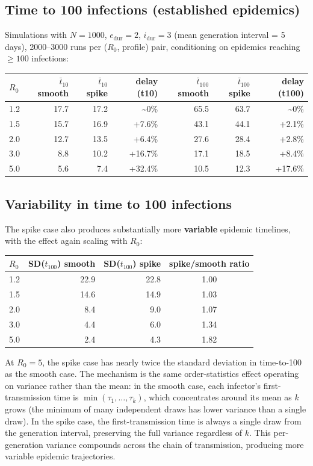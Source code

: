 \documentclass[11pt]{article}
\begin{document}
\subsection{Time to 100 infections (established epidemics)}

Simulations with $N = 1000$, $e_{\text{dur}} = 2$, $i_{\text{dur}} = 3$ (mean generation interval = 5 days), 2000--3000 runs per ($R_0$, profile) pair, conditioning on epidemics reaching $\geq 100$ infections:

\medskip
{\footnotesize
\begin{tabular}{lrrrrrr}
\toprule
$R_0$ & $\bar{t}_{10}$ smooth & $\bar{t}_{10}$ spike & delay (t10) & $\bar{t}_{100}$ smooth & $\bar{t}_{100}$ spike & delay (t100) \\
\midrule
1.2 & 17.7 & 17.2 & \textasciitilde0\% & 65.5 & 63.7 & \textasciitilde0\% \\
1.5 & 15.7 & 16.9 & +7.6\% & 43.1 & 44.1 & +2.1\% \\
2.0 & 12.7 & 13.5 & +6.4\% & 27.6 & 28.4 & +2.8\% \\
3.0 & 8.8  & 10.2 & +16.7\% & 17.1 & 18.5 & +8.4\% \\
5.0 & 5.6  & 7.4  & +32.4\% & 10.5 & 12.3 & +17.6\% \\
\bottomrule
\end{tabular}
}
\medskip

\subsection{Variability in time to 100 infections}

The spike case also produces substantially more \textbf{variable} epidemic timelines, with the effect again scaling with $R_0$:

\medskip
\begin{tabular}{lrrc}
\toprule
$R_0$ & SD($t_{100}$) smooth & SD($t_{100}$) spike & spike/smooth ratio \\
\midrule
1.2 & 22.9 & 22.8 & 1.00 \\
1.5 & 14.6 & 14.9 & 1.03 \\
2.0 & 8.4  & 9.0  & 1.07 \\
3.0 & 4.4  & 6.0  & 1.34 \\
5.0 & 2.4  & 4.3  & 1.82 \\
\bottomrule
\end{tabular}
\medskip

At $R_0 = 5$, the spike case has nearly twice the standard deviation in time-to-100 as the smooth case. The mechanism is the same order-statistics effect operating on variance rather than the mean: in the smooth case, each infector's first-transmission time is $\min(\tau_1, \ldots, \tau_k)$, which concentrates around its mean as $k$ grows (the minimum of many independent draws has lower variance than a single draw). In the spike case, the first-transmission time is always a single draw from the generation interval, preserving the full variance regardless of $k$. This per-generation variance compounds across the chain of transmission, producing more variable epidemic trajectories.
\end{document}
